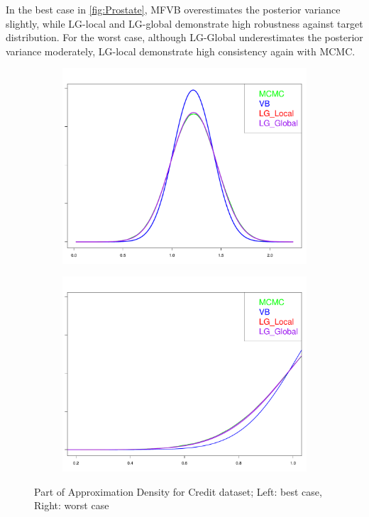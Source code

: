 In the best case in \autoref{fig:Prostate}, MFVB overestimates the posterior variance slightly, while LG-local and LG-global demonstrate high robustness against target distribution. For the worst case, although LG-Global underestimates the posterior variance moderately, LG-local demonstrate high consistency again with MCMC.

\begin{figure}[h]
	\begin{subfigure}{0.5\textwidth}
		\centering
		\includegraphics[page = 11, width=\linewidth,keepaspectratio]{lasso_densities_Credit.pdf}
	\end{subfigure}
	\begin{subfigure}{0.5\textwidth}
		\includegraphics[page = 2, width=\linewidth,keepaspectratio]{lasso_densities_Credit-1.pdf}
	\end{subfigure}
	\caption{Part of Approximation Density for Credit dataset; Left: best case, Right: worst case}
	\label{fig:Credit}
\end{figure}

